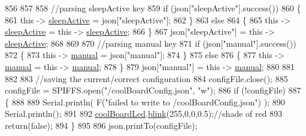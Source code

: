 \begin{DoxyCode}
856 
857             
858             \textcolor{comment}{//parsing sleepActive key}
859             \textcolor{keywordflow}{if} (json[\textcolor{stringliteral}{"sleepActive"}].success())
860             \{
861                 \textcolor{keyword}{this} -> \hyperlink{class_cool_board_a0a51b2287139f66c738101fb53139230}{sleepActive} = json[\textcolor{stringliteral}{"sleepActive"}];
862             \}
863             \textcolor{keywordflow}{else}
864             \{
865                 \textcolor{keyword}{this} -> \hyperlink{class_cool_board_a0a51b2287139f66c738101fb53139230}{sleepActive} = \textcolor{keyword}{this} -> \hyperlink{class_cool_board_a0a51b2287139f66c738101fb53139230}{sleepActive};
866             \}
867             json[\textcolor{stringliteral}{"sleepActive"}] = \textcolor{keyword}{this} -> \hyperlink{class_cool_board_a0a51b2287139f66c738101fb53139230}{sleepActive};
868 
869 
870             \textcolor{comment}{//parsing manual key}
871             \textcolor{keywordflow}{if} (json[\textcolor{stringliteral}{"manual"}].success())
872             \{
873                 \textcolor{keyword}{this} -> \hyperlink{class_cool_board_a7c8e505a5804b109e112d5a03df6ea2b}{manual} = json[\textcolor{stringliteral}{"manual"}];
874             \}
875             \textcolor{keywordflow}{else}
876             \{
877                 \textcolor{keyword}{this} -> \hyperlink{class_cool_board_a7c8e505a5804b109e112d5a03df6ea2b}{manual} = \textcolor{keyword}{this} -> \hyperlink{class_cool_board_a7c8e505a5804b109e112d5a03df6ea2b}{manual};
878             \}
879             json[\textcolor{stringliteral}{"manual"}] = \textcolor{keyword}{this} -> \hyperlink{class_cool_board_a7c8e505a5804b109e112d5a03df6ea2b}{manual};
880 
881 
882 
883             \textcolor{comment}{//saving the current/correct configuration}
884             configFile.close();
885             configFile = SPIFFS.open(\textcolor{stringliteral}{"/coolBoardConfig.json"}, \textcolor{stringliteral}{"w"});
886             \textcolor{keywordflow}{if} (!configFile)
887             \{
888             
889                 Serial.println( F(\textcolor{stringliteral}{"failed to write to /coolBoardConfig.json"}) );
890                 Serial.println();
891 
892                 \hyperlink{class_cool_board_a1b1d3c684a5baa56b08486e192fd8e97}{coolBoardLed}.\hyperlink{class_cool_board_led_a96e1ea13003eee34c9dbcef340404426}{blink}(255,0,0,0.5);\textcolor{comment}{//shade of red     }
893                 \textcolor{keywordflow}{return}(\textcolor{keyword}{false});
894             \}
895 
896             json.printTo(configFile);

\end{DoxyCode}
